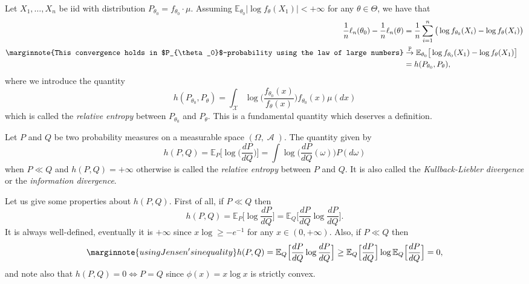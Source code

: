 \documentclass[
	fontsize=11pt, %
	twoside=false, %
	numbers=noenddot, %
]{kaobook}
\DeclareMathOperator{\cA}{{\mathcal A}}
\DeclareMathOperator{\cX}{{\mathcal X}}
\renewcommand{\P}{\mathbb P}
\newcommand{\E}{\mathbb E}
\newcommand{\gopro}{\overset{\P}{\rightarrow}}
\begin{document}
Let $X_1, \ldots, X_n$ be iid with distribution $P_{\theta_0} = f_{\theta_0} \cdot \mu$.
Assuming $\E_{\theta_0} | \log f_{\theta}(X_1) | < +\infty$ for any $\theta \in \Theta$,
we have that
\begin{equation}
	\label{eq:likelihood-kullback-limit}
	\begin{split}
	\frac 1n \ell_n(\theta_0) - \frac 1n \ell_n(\theta) &= \frac 1n \sum_{i=1}^n \big(
	 \log f_{\theta_0}(X_i) - \log f_{\theta}(X_i) \big) \\
	\marginnote{This convergence holds in $P_{\theta_0}$-probability using the law of large numbers}
	& \gopro \E_{\theta_0} \big[ \log f_{\theta_0}(X_1) - \log f_{\theta}(X_1) \big] \\
	&= h(P_{\theta_0}, P_\theta),		
	\end{split}
\end{equation}
where we introduce the quantity
\begin{equation*}
	h(P_{\theta_0}, P_\theta) = \int_{\cX} \log \Big( 
	\frac{f_{\theta_0}(x)}{f_{\theta}(x)} \Big) f_{\theta_0}(x) \mu(dx)
\end{equation*}
which is called the \emph{relative entropy} between $P_{\theta_0}$ and $P_\theta$.
This is a fundamental quantity which deserves a definition.
\begin{definition}
	\label{def:relative-entropy}
	Let $P$ and $Q$ be two probability measures on a measurable space $(\Omega, \cA)$. 
	The quantity given by
	\begin{equation*}
		h(P, Q) = \E_P \Big[ \log \Big( \frac{dP}{dQ} \Big) \Big] = \int \log \Big( \frac{dP}{dQ}(\omega) \Big)  P(d \omega)
	\end{equation*}
	when $P \ll Q$ and $h(P, Q) = +\infty$ otherwise is called the \emph{relative entropy} between $P$ and $Q$.
	It is also called the \emph{Kullback-Liebler divergence} or the \emph{information divergence}.
\end{definition}
Let us give some properties about $h(P, Q)$.
First of all, if $P \ll Q$ then
\begin{equation*}
	h(P, Q) = \E_P \Big[\log \frac{dP}{dQ} \Big] = \E_Q \Big[\frac{dP}{dQ} 
	\log \frac{dP}{dQ} \Big].
\end{equation*}
It is always well-defined, eventually it is $+\infty$ since $x \log \geq -e^{-1}$ for any $x \in (0, +\infty)$.
Also, if $P \ll Q$ then
\begin{equation*}
	\marginnote{using Jensen's inequality}
	h(P, Q) = \E_Q\Big[ \frac{dP}{dQ} \log \frac{dP}{dQ} \Big] 
	\geq \E_Q\Big[ \frac{dP}{dQ} \Big] \log \E_Q\Big[ \frac{dP}{dQ} \Big] 
	= 0,
\end{equation*}
and note also that $h(P, Q) = 0 \Leftrightarrow P = Q$ since $\phi(x) = x \log x$ is strictly convex.
\end{document}
